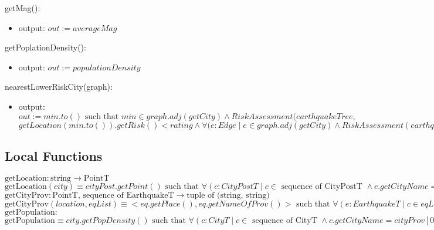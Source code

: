 \documentclass[12pt]{article}
\begin{document}
\noindent getMag():
\begin{itemize}
\item output: $\mathit{out} := averageMag$ 
\end{itemize}

\noindent getPoplationDensity():
\begin{itemize}
\item output: $\mathit{out} := populationDensity$ 
\end{itemize}

\noindent nearestLowerRiskCity(graph):
\begin{itemize}
\item output: $\mathit{out} := min.to() \mbox{ such that } min \in graph.adj(getCity) \land RiskAssessment(earthquakeTree,$\\ $getLocation(min.to()).getRisk() < rating \land  \forall (e : Edge \;|\; e \in graph.adj(getCity) \land 
RiskAssessment(earthquakeTree, getLocation(e.to()).getRisk() < rating : e.weight \ge min.weight)$ 
\end{itemize}





\subsection*{Local Functions}
\noindent $\text{getLocation}: \text{string} \rightarrow \text{PointT}$\\
\noindent $\text{getLocation}(city) \equiv cityPost.getPoint() \mbox{ such that } \forall (c: CityPostT \;|\; c \in \mbox{ sequence of CityPostT } \land c.getCityName = city: cityPost = c ) $\\

\noindent $\text{getCityProv}: \text{PointT, sequence of EarthquakeT} \rightarrow \text{tuple of (string, string)}$\\
\noindent $\text{getCityProv}(location, eqList) \equiv <eq.getPlace(), eq.getNameOfProv()> \mbox{ such that } \forall (e: EarthquakeT \;|\; c \in eqList: location.distanceTo(e.getPointT()) \ge location.distanceTo(eq.getPointT()))$\\

\noindent $\text{getPopulation}: $\\
\noindent $\text{getPopulation} \equiv city.getPopDensity() \mbox{ such that } \forall (c: CityT \;|\; c \in \mbox{ sequence of CityT } \land c.getCityName = cityProv[0] \land c.getProvince = cityProv[1]: city = c ) $\\
\end{document}
